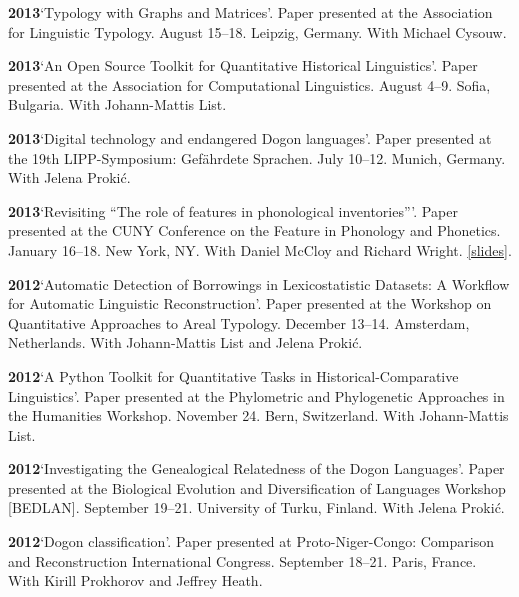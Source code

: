 \documentclass[11pt]{article}
\newcommand{\hangpara}{
 \setlength{\parindent}{0in} %
 \hangindent=0.42in %
}
\begin{document}
\vskip 6pt
\hangpara
{\bf 2013}\hspace{1ex}`Typology with Graphs and Matrices'. Paper presented at the Association for Linguistic Typology. August 15--18. Leipzig, Germany. With Michael Cysouw.

\vskip 6pt
\hangpara
{\bf 2013}\hspace{1ex}`An Open Source Toolkit for Quantitative Historical Linguistics'. Paper presented at the Association for Computational Linguistics. August 4--9. Sofia, Bulgaria. With Johann-Mattis List.

\vskip 6pt
\hangpara
{\bf 2013}\hspace{1ex}`Digital technology and endangered Dogon languages'. Paper presented at the 19th LIPP-Symposium: Gef{\"a}hrdete Sprachen. July 10--12. Munich, Germany. With Jelena Proki{\'c}.

\vskip 6pt
\hangpara
{\bf 2013}\hspace{1ex}`Revisiting ``The role of features in phonological inventories'''. Paper presented at the CUNY Conference on the Feature in Phonology and Phonetics. January 16--18. New York, NY. With Daniel McCloy and Richard Wright. \href{http://dan.mccloy.info/pubs/McCloyEtAl2013_cunyFeatureConf.pdf}{[slides]}.

\vskip 6pt
\hangpara
{\bf 2012}\hspace{1ex}`Automatic Detection of Borrowings in Lexicostatistic Datasets: A Workflow for Automatic Linguistic Reconstruction'. Paper presented at the Workshop on Quantitative Approaches to Areal Typology. December 13--14. Amsterdam, Netherlands. With Johann-Mattis List and Jelena Proki{\'c}.

\vskip 6pt
\hangpara
{\bf 2012}\hspace{1ex}`A Python Toolkit for Quantitative Tasks in Historical-Comparative Linguistics'. Paper presented at the Phylometric and Phylogenetic Approaches in the Humanities Workshop. November 24. Bern, Switzerland. With Johann-Mattis List.

\vskip 6pt
\hangpara
{\bf 2012}\hspace{1ex}`Investigating the Genealogical Relatedness of the Dogon Languages'. Paper presented at the Biological Evolution and Diversification of Languages Workshop [BEDLAN]. September 19--21. University of Turku, Finland. With Jelena Proki{\'c}.

\vskip 6pt
\hangpara
{\bf 2012}\hspace{1ex}`Dogon classification'. Paper presented at Proto-Niger-Congo: Comparison and Reconstruction International Congress. September 18--21. Paris, France. With Kirill Prokhorov and Jeffrey Heath.
\end{document}
